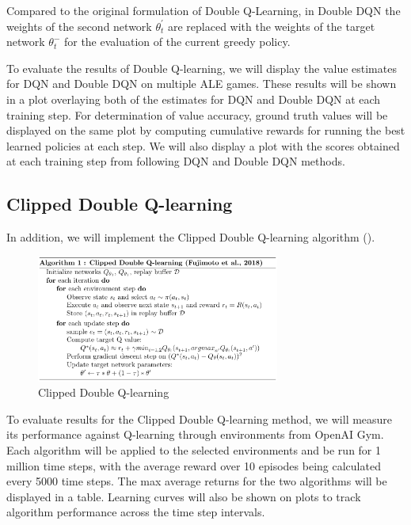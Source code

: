 \documentclass{article}
\begin{document}
Compared to the original formulation of Double Q-Learning, in Double DQN the
weights of the second network $\theta _{t}^{'}$ are replaced with the weights of
the target network $\theta_{t}^{-}$ for the evaluation of the current greedy
policy.

To evaluate the results of Double Q-learning, we will display the value
estimates for DQN and Double DQN on multiple ALE games.  These results will be
shown in a plot overlaying both of the estimates for DQN and Double DQN at each
training step. For determination of value accuracy, ground truth values will be
displayed on the same plot by computing cumulative rewards for running the best
learned policies at each step. We will also display a plot with the scores
obtained at each training step from following DQN and Double DQN methods.

\subsection{Clipped Double Q-learning}
In addition, we will implement the Clipped Double Q-learning
algorithm (\citet{fujimoto2018addressing}). 

\begin{figure}[!htbp]
    \begin{center}
    \includegraphics[width=8cm]{alg1_ClippedDDQ_Fujimoto.png}
    \end{center}
    \caption{Clipped Double Q-learning}
    \label{fig:numcomments}
\end{figure}

To evaluate results for the Clipped Double Q-learning method, we will measure
its performance against Q-learning through environments from OpenAI Gym. Each
algorithm will be applied to the selected environments and be run for 1 million
time steps, with the average reward over 10 episodes being calculated every 5000
time steps. The max average returns for the two algorithms will be displayed in
a table. Learning curves will also be shown on plots to track algorithm
performance across the time step intervals.


\end{document}
